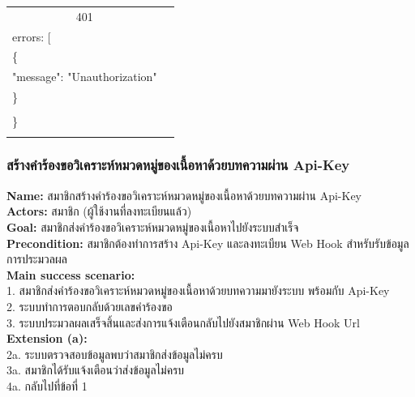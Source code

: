 \documentclass[12pt,oneside,openright,a4paper]{cpe-thai-project}
\begin{document}
\begin{itemize}
\begin{longtable}[!ht]{p{3cm}|p{8cm}}
    \multicolumn{1}{c|}{401}  &
    \begin{tabular}[c]{@{}l@{}}\{\\ \quad errors: {[}\\ \quad\quad\{\\ \quad\quad\quad"message": "Unauthorization"\\ \quad\quad\}\\\quad {]}\\ \}\end{tabular}                                                                         \\ \hline
    \hhline{==}  
\end{longtable}

\subsubsection{สร้างคำร้องขอวิเคราะห์หมวดหมู่ของเนื้อหาด้วยบทความผ่าน Api-Key}
\textbf{Name: }สมาชิกสร้างคำร้องขอวิเคราะห์หมวดหมู่ของเนื้อหาด้วยบทความผ่าน Api-Key \\
\textbf{Actors: }สมาชิก (ผู้ใช้งานที่ลงทะเบียนแล้ว) \\
\textbf{Goal: }สมาชิกส่งคำร้องขอวิเคราะห์หมวดหมู่ของเนื้อหาไปยังระบบสำเร็จ \\
\textbf{Precondition: }สมาชิกต้องทำการสร้าง Api-Key และลงทะเบียน Web Hook สำหรับรับข้อมูลการประมวลผล \\
\textbf{Main success scenario: } \\
  \hspace*{0.5cm}1. สมาชิกส่งคำร้องขอวิเคราะห์หมวดหมู่ของเนื้อหาด้วยบทความมายังระบบ พร้อมกับ Api-Key \\
  \hspace*{0.5cm}2. ระบบทำการตอบกลับด้วยเลขคำร้องขอ \\
  \hspace*{0.5cm}3. ระบบประมวลผลเสร็จสิ้นและส่งการแจ้งเตือนกลับไปยังสมาชิกผ่าน Web Hook Url  \\
\textbf{Extension (a): } \\
  \hspace*{0.5cm}2a. ระบบตรวจสอบข้อมูลพบว่าสมาชิกส่งข้อมูลไม่ครบ \\
  \hspace*{0.5cm}3a. สมาชิกได้รับแจ้งเตือนว่าส่งข้อมูลไม่ครบ \\
  \hspace*{0.5cm}4a. กลับไปที่ข้อที่ 1 \newpage
\begin{figure}[!ht]\centering

\end{figure}
\end{itemize}
\end{document}
